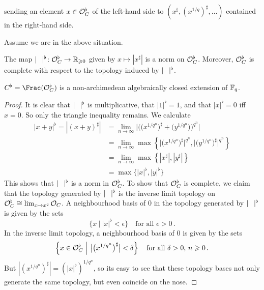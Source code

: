 sending an element $x\in \mathcal{O}_C^\flat$ of the left-hand side to $(x^\sharp, (x^{1/q})^\sharp,\dotsc)$ contained in the right-hand side.
\begin{lem}\label{lem:OcflatisOF}
	Assume we are in the above situation.
	\begin{numerate}
		\item The map $|\blank|^\flat\colon \Oo_C^\flat\morphism\IR_{\geq 0}$ given by $x\mapsto |x^\sharp|$ is a norm on $\mathcal{O}_C^\flat$. Moreover, $\mathcal{O}_C^\flat$ is complete with respect to the topology induced by $|\blank|^\flat$.
		\item $C^\flat=\Frac(\Oo_C^\flat)$ is a non-archimedean algebraically closed extension of $\mathbb{F}_q$.
	\end{numerate}
\end{lem}
\begin{proof}
	It is clear that $|\blank|^\flat$ is multiplicative, that $|1|^\flat=1$, and that $|x|^\flat=0$ iff $x=0$. So only the triangle inequality remains. We calculate
	\begin{align*}
		|x+y|^\flat=|(x+y)^\sharp|&=\lim_{n\to\infty}\bigg|\Big(\big(x^{1/q^n}\big)^\sharp+\big(y^{1/q^n}\big)\Big)^{q^n}\bigg|\\
		&=\lim_{n\to\infty}\max\left\{\big|\big(x^{1/q^n}\big)^\sharp\big|^{q^n},\big|\big(y^{1/q^n}\big)^\sharp\big|^{q^n}\right\}\\
		&=\lim_{n\to\infty}\max\left\{|x^\sharp|,|y^\sharp|\right\}\\
		&=\max\big\{|x|^\flat,|y|^\flat\big\}
	\end{align*}
	This shows that $|\blank|^\flat$ is a norm in $\mathcal{O}_C^\flat$. To show that $\mathcal{O}_C^\flat$ is complete, we claim that the topology generated by $|\blank|^\flat$ is the inverse limit topology on $\mathcal{O}_C^\flat\cong \operatorname*{lim}_{x\mapsto x^q}\mathcal{O}_C$. A neighbourhood basis of $0$ in the topology generated by $|\blank|^\flat$ is given by the sets
	\begin{equation*}
		\big\{x\ \big|\ |x|^\flat<\epsilon\big\}\quad\text{for all }\epsilon>0\,.
	\end{equation*}
	In the inverse limit topology, a neighbourhood basis of $0$ is given by the sets
	\begin{equation*}
		\left\{x\in \mathcal{O}_C^\flat\ \middle|\  \big|\big(x^{1/q^n}\big)^\sharp\big|<\delta\right\}\quad\text{for all }\delta>0\text{, }n\geqslant 0\,.
	\end{equation*}
	But $|(x^{1/q^n})^\sharp|=(|x|^\flat)^{1/q^n}$, so its easy to see that these topology bases not only generate the same topology, but even coincide on the nose.
	

\end{proof}
